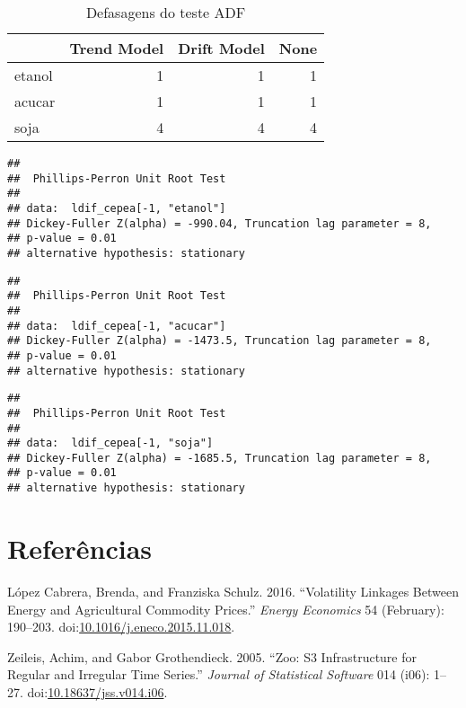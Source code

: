 \documentclass[]{article}
\begin{document}
\begin{longtable}[t]{lrrr}
\caption{\label{tab:ADF e KPSS logdif}Defasagens do teste ADF}\\
\toprule
  & Trend Model & Drift Model & None\\
\midrule
etanol & 1 & 1 & 1\\
acucar & 1 & 1 & 1\\
soja & 4 & 4 & 4\\
\bottomrule
\end{longtable}

\begin{verbatim}
## 
##  Phillips-Perron Unit Root Test
## 
## data:  ldif_cepea[-1, "etanol"]
## Dickey-Fuller Z(alpha) = -990.04, Truncation lag parameter = 8,
## p-value = 0.01
## alternative hypothesis: stationary
\end{verbatim}

\begin{verbatim}
## 
##  Phillips-Perron Unit Root Test
## 
## data:  ldif_cepea[-1, "acucar"]
## Dickey-Fuller Z(alpha) = -1473.5, Truncation lag parameter = 8,
## p-value = 0.01
## alternative hypothesis: stationary
\end{verbatim}

\begin{verbatim}
## 
##  Phillips-Perron Unit Root Test
## 
## data:  ldif_cepea[-1, "soja"]
## Dickey-Fuller Z(alpha) = -1685.5, Truncation lag parameter = 8,
## p-value = 0.01
## alternative hypothesis: stationary
\end{verbatim}

\pagebreak

\section*{Referências}\label{referencias}

\setlength{\parindent}{0in}

\hypertarget{refs}{}
\hypertarget{ref-lopez_cabrera_volatility_2016}{}
López Cabrera, Brenda, and Franziska Schulz. 2016. ``Volatility Linkages
Between Energy and Agricultural Commodity Prices.'' \emph{Energy
Economics} 54 (February): 190--203.
doi:\href{https://doi.org/10.1016/j.eneco.2015.11.018}{10.1016/j.eneco.2015.11.018}.

\hypertarget{ref-zeileis_zoo:_2005}{}
Zeileis, Achim, and Gabor Grothendieck. 2005. ``Zoo: S3 Infrastructure
for Regular and Irregular Time Series.'' \emph{Journal of Statistical
Software} 014 (i06): 1--27.
doi:\href{https://doi.org/10.18637/jss.v014.i06}{10.18637/jss.v014.i06}.
\end{document}
